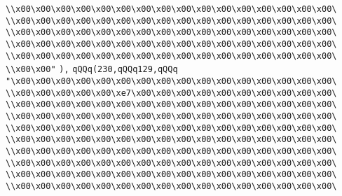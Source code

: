 \verb|\\x00\x00\x00\x00\x00\x00\x00\x00\x00\x00\x00\x00\x00\x00\x00\x00\|\newline
\verb|\\x00\x00\x00\x00\x00\x00\x00\x00\x00\x00\x00\x00\x00\x00\x00\x00\|\newline
\verb|\\x00\x00\x00\x00\x00\x00\x00\x00\x00\x00\x00\x00\x00\x00\x00\x00\|\newline
\verb|\\x00\x00\x00\x00\x00\x00\x00\x00\x00\x00\x00\x00\x00\x00\x00\x00\|\newline
\verb|\\x00\x00\x00\x00\x00\x00\x00\x00\x00\x00\x00\x00\x00\x00\x00\x00\|\newline
\verb|\\x00\x00"|\newline
\verb|),|\newline
\verb|qQQq(230,qQQq129,qQQq|\newline
\verb|"\x00\x00\x00\x00\x00\x00\x00\x00\x00\x00\x00\x00\x00\x00\x00\x00\|\newline
\verb|\\x00\x00\x00\x00\x00\xe7\x00\x00\x00\x00\x00\x00\x00\x00\x00\x00\|\newline
\verb|\\x00\x00\x00\x00\x00\x00\x00\x00\x00\x00\x00\x00\x00\x00\x00\x00\|\newline
\verb|\\x00\x00\x00\x00\x00\x00\x00\x00\x00\x00\x00\x00\x00\x00\x00\x00\|\newline
\verb|\\x00\x00\x00\x00\x00\x00\x00\x00\x00\x00\x00\x00\x00\x00\x00\x00\|\newline
\verb|\\x00\x00\x00\x00\x00\x00\x00\x00\x00\x00\x00\x00\x00\x00\x00\x00\|\newline
\verb|\\x00\x00\x00\x00\x00\x00\x00\x00\x00\x00\x00\x00\x00\x00\x00\x00\|\newline
\verb|\\x00\x00\x00\x00\x00\x00\x00\x00\x00\x00\x00\x00\x00\x00\x00\x00\|\newline
\verb|\\x00\x00\x00\x00\x00\x00\x00\x00\x00\x00\x00\x00\x00\x00\x00\x00\|\newline
\verb|\\x00\x00\x00\x00\x00\x00\x00\x00\x00\x00\x00\x00\x00\x00\x00\x00\|\newline
